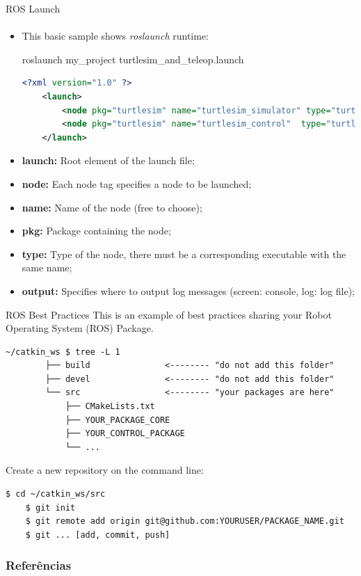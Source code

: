 \documentclass[aspectratio=169]{beamer}
\begin{document}
\begin{frame}[fragile]{ROS Launch}
	\framesubtitle{}

	\begin{itemize}
		\item This basic sample shows \textit{roslaunch} runtime:
	
	\begin{block}{roslaunch my\_project turtlesim\_and\_teleop.launch}
		\begin{lstlisting}[language=XML]
	<?xml version="1.0" ?>
	<launch>
		<node pkg="turtlesim" name="turtlesim_simulator" type="turtlesim_node"></node>
		<node pkg="turtlesim" name="turtlesim_control"  type="turtle_teleop_key"></node>
	</launch>
		\end{lstlisting}
	\end{block}

		\item \textbf{launch:} Root element of the launch file;
		\item \textbf{node:} Each node tag specifies a node to be launched;
		\item \textbf{name:} Name of the node (free to choose);
		\item \textbf{pkg:} Package containing the node;
		\item \textbf{type:} Type of the node, there must be a corresponding executable with the same name;
		\item \textbf{output:} Specifies where to output log messages (screen: console, log: log file);
	
	\end{itemize}

\end{frame}

\begin{frame}[fragile]{ROS Best Practices}
	This is an example of best practices sharing your Robot Operating System (ROS) Package.

	\begin{lstlisting}[style=ascii-tree]
		~/catkin_ws $ tree -L 1
		├── build				<-------- "do not add this folder"
		├── devel				<-------- "do not add this folder"
		└── src					<-------- "your packages are here"
			├── CMakeLists.txt
			├── YOUR_PACKAGE_CORE
			├── YOUR_CONTROL_PACKAGE
			└── ...
		\end{lstlisting}

	Create a new repository on the command line:

		\begin{lstlisting}[language=bash]
	$ cd ~/catkin_ws/src
	$ git init
	$ git remote add origin git@github.com:YOURUSER/PACKAGE_NAME.git
	$ git ... [add, commit, push]
		\end{lstlisting}
	\end{frame}


\begin{frame}[t, allowframebreaks]
	\frametitle{Referências}
	
\end{frame}
\end{document}
